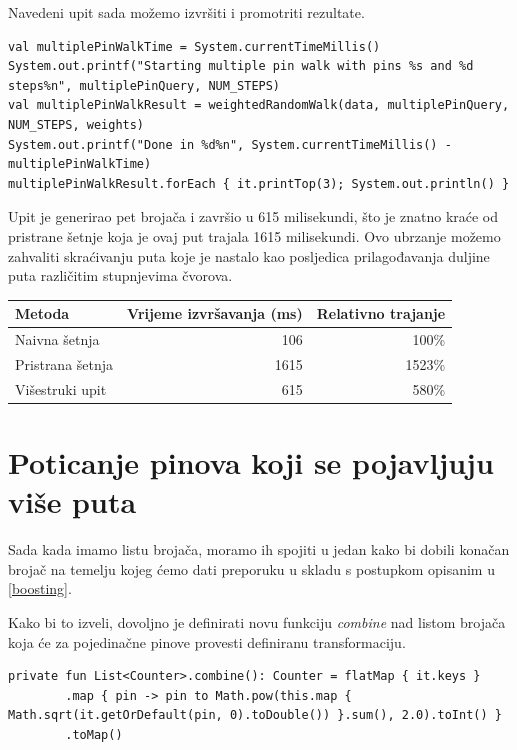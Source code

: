 \documentclass[times, utf8, seminar]{fer}
\begin{document}
Navedeni upit sada možemo izvršiti i promotriti rezultate.

\begin{lstlisting}
val multiplePinWalkTime = System.currentTimeMillis()
System.out.printf("Starting multiple pin walk with pins %s and %d steps%n", multiplePinQuery, NUM_STEPS)
val multiplePinWalkResult = weightedRandomWalk(data, multiplePinQuery, NUM_STEPS, weights)
System.out.printf("Done in %d%n", System.currentTimeMillis() - multiplePinWalkTime)
multiplePinWalkResult.forEach { it.printTop(3); System.out.println() }
\end{lstlisting}

Upit je generirao pet brojača i završio u 615 milisekundi, što je znatno kraće od pristrane šetnje koja je ovaj put trajala 1615 milisekundi. Ovo ubrzanje možemo zahvaliti skraćivanju puta koje je nastalo kao posljedica prilagođavanja duljine puta različitim stupnjevima čvorova.

\begin{center}
		  \begin{tabular}{ |l|r|r| }
					 \hline
					 Metoda & Vrijeme izvršavanja (ms) & Relativno trajanje\\
					 \hline
					 Naivna šetnja & 106 & 100\% \\
					 \hline
					 Pristrana šetnja & 1615 & 1523\% \\
					 \hline
					 Višestruki upit & 615 & 580\% \\
					 \hline
		  \end{tabular}
\end{center}

\section{Poticanje pinova koji se pojavljuju više puta}

Sada kada imamo listu brojača, moramo ih spojiti u jedan kako bi dobili konačan brojač na temelju kojeg ćemo dati preporuku u skladu s postupkom opisanim u \ref{boosting}.

Kako bi to izveli, dovoljno je definirati novu funkciju \textit{combine} nad listom brojača koja će za pojedinačne pinove provesti definiranu transformaciju.

\begin{lstlisting}
private fun List<Counter>.combine(): Counter = flatMap { it.keys }
        .map { pin -> pin to Math.pow(this.map { Math.sqrt(it.getOrDefault(pin, 0).toDouble()) }.sum(), 2.0).toInt() }
        .toMap()
\end{lstlisting}
\end{document}
